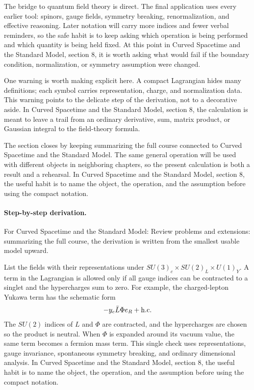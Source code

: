 The bridge to quantum field theory is direct.  The final application uses every earlier tool: spinors, gauge fields, symmetry breaking, renormalization, and effective reasoning.  Later notation will carry more indices and fewer verbal reminders, so the safe habit is to keep asking which operation is being performed and which quantity is being held fixed.  At this point in Curved Spacetime and the Standard Model, section 8, it is worth asking what would fail if the boundary condition, normalization, or symmetry assumption were changed.

One warning is worth making explicit here.  A compact Lagrangian hides many definitions; each symbol carries representation, charge, and normalization data.  This warning points to the delicate step of the derivation, not to a decorative aside.  In Curved Spacetime and the Standard Model, section 8, the calculation is meant to leave a trail from an ordinary derivative, sum, matrix product, or Gaussian integral to the field-theory formula.

The section closes by keeping summarizing the full course connected to Curved Spacetime and the Standard Model.  The same general operation will be used with different objects in neighboring chapters, so the present calculation is both a result and a rehearsal.  In Curved Spacetime and the Standard Model, section 8, the useful habit is to name the object, the operation, and the assumption before using the compact notation.



\paragraph{Step-by-step derivation.}

For Curved Spacetime and the Standard Model: Review problems and extensions: summarizing the full course, the derivation is written from the smallest usable model upward.

List the fields with their representations under \(SU(3)_c\times SU(2)_L\times U(1)_Y\).  A term in the Lagrangian is allowed only if all gauge indices can be contracted to a singlet and the hypercharges sum to zero.  For example, the charged-lepton Yukawa term has the schematic form
\[
  -y_e\bar L\Phi e_R+\hbox{h.c.}
\]
The \(SU(2)\) indices of \(L\) and \(\Phi\) are contracted, and the hypercharges are chosen so the product is neutral.  When \(\Phi\) is expanded around its vacuum value, the same term becomes a fermion mass term.  This single check uses representations, gauge invariance, spontaneous symmetry breaking, and ordinary dimensional analysis.  In Curved Spacetime and the Standard Model, section 8, the useful habit is to name the object, the operation, and the assumption before using the compact notation.

